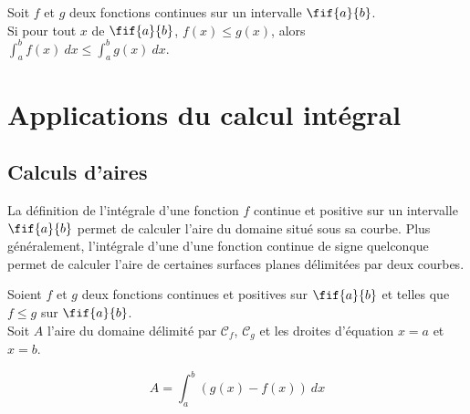 \documentclass[a4paper,11pt,cours]{nsi} %
\begin{document}
\begin{propriete}
    Soit $f$ et $g$ deux fonctions continues sur un intervalle $\fif{a}{b}$.\\
    Si pour tout $x$ de $\fif{a}{b}$, $f(x) \leqslant g(x)$, alors $\displaystyle \int_a^b f(x) \ dx \leqslant \int_a^b g(x) \ dx$.
\end{propriete}

\section{Applications du calcul intégral}
\subsection*{Calculs d'aires}
La définition de l'intégrale d'une fonction $f$ continue et positive sur un intervalle $\fif{a}{b}$ permet de calculer l'aire du domaine situé sous sa courbe. Plus généralement, l'intégrale d'une d'une fonction continue de signe quelconque permet de calculer l'aire de certaines surfaces planes délimitées par deux courbes.

\begin{propriete}[]
    Soient $f$ et $g$ deux fonctions continues et positives sur $\fif{a}{b}$ et telles que $f\leqslant g$ sur $\fif{a}{b}$.\\
	Soit $A$ l'aire du domaine délimité par $\mathcal{C}_f$, $\mathcal{C}_g$ et les droites d'équation $x=a$ et $x=b$.
	\begin{center}
		\def\xmin{-2} \def\ymin{-1}\def\xmax{5}\def\ymax{5}
		\def\G{-1.05*(2.711828^(-0.5*\x))*cos(200*\x)+2.5}
		\def\F{-1.1*(2.711828^(-0.5*\x))*cos(360*\x/3.141592654)+1.5}
	\end{center}
	$$A=\int_a^b\left(g(x)-f(x)\right)\ dx$$
\end{propriete}
\end{document}
